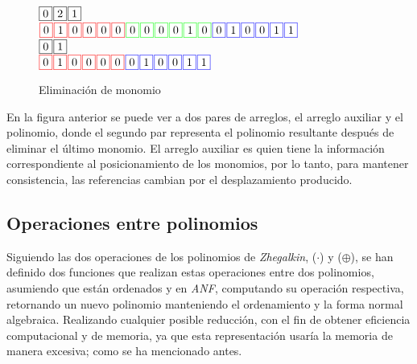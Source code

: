 \begin{figure}[!ht]
    \centering
    \begin{minipage}[c][3.5cm][b]{.65\textwidth}
    \noindent
    $\fbox{0} \hspace*{.1em} \fbox{2} \hspace*{.1em} \fbox{1}$\ \\
    \noindent
    $\fcolorbox{red}{white}{0} \sep \fcolorbox{red}{white}{1} \sep \fcolorbox{red}{white}{0} \sep \fcolorbox{red}{white}{0} \sep \fcolorbox{red}{white}{0} \sep \fcolorbox{red}{white}{0} \sep \fcolorbox{green}{white}{0} \sep \fcolorbox{green}{white}{0} \sep \fcolorbox{green}{white}{0} \sep \fcolorbox{green}{white}{0} \sep \fcolorbox{green}{white}{1} \sep \fcolorbox{green}{white}{0} \sep \fcolorbox{blue}{white}{0} \sep \fcolorbox{blue}{white}{1} \sep \fcolorbox{blue}{white}{0} \sep \fcolorbox{blue}{white}{0} \sep \fcolorbox{blue}{white}{1} \sep \fcolorbox{blue}{white}{1}$\ \\
    \noindent
    $\fbox{0} \hspace*{.1em} \fbox{1}$\ \\
    \noindent
    $\fcolorbox{red}{white}{0} \sep \fcolorbox{red}{white}{1} \sep \fcolorbox{red}{white}{0} \sep \fcolorbox{red}{white}{0} \sep \fcolorbox{red}{white}{0} \sep \fcolorbox{red}{white}{0} \sep \fcolorbox{blue}{white}{0} \sep \fcolorbox{blue}{white}{1} \sep \fcolorbox{blue}{white}{0} \sep \fcolorbox{blue}{white}{0} \sep \fcolorbox{blue}{white}{1} \sep \fcolorbox{blue}{white}{1}$
    \end{minipage}
\caption{Eliminación de monomio}
\label{fig:p_e}
\end{figure}

\newpage

En la figura anterior se puede ver a dos pares de arreglos, el arreglo auxiliar y el polinomio, donde el segundo par representa el polinomio resultante después de eliminar el último monomio. El arreglo auxiliar es quien tiene la información correspondiente al posicionamiento de los monomios, por lo tanto, para mantener consistencia, las referencias cambian por el desplazamiento producido.

\subsection{Operaciones entre polinomios}

Siguiendo las dos operaciones de los polinomios de \textit{Zhegalkin}, ($\cdot$) y ($\oplus$), se han definido dos funciones que realizan estas operaciones entre dos polinomios, asumiendo que están ordenados y en \textit{ANF}, computando su operación respectiva, retornando un nuevo polinomio manteniendo el ordenamiento y la forma normal algebraica. Realizando cualquier posible reducción, con el fin de obtener eficiencia computacional y de memoria, ya que esta representación usaría la memoria de manera excesiva; como se ha mencionado antes.

